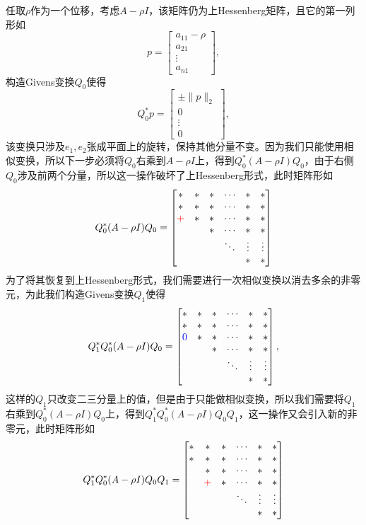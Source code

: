 \documentclass[a4paper,10pt]{ctexart}
\begin{document}
任取$ \rho $作为一个位移，考虑$ A-\rho I $，该矩阵仍为上Hessenberg矩阵，且它的第一列形如
\[
    p = \begin{bmatrix} 
        a_{11}-\rho \\ a_{21} \\ \vdots \\ a_{n1}
    \end{bmatrix},
\]
构造Givens变换$ Q_0 $使得
\[
    Q_0^* p = \begin{bmatrix} 
        \pm\| p \|_2 \\ 0 \\ \vdots \\ 0
    \end{bmatrix},
\]
该变换只涉及$ e_1,e_2 $张成平面上的旋转，保持其他分量不变。因为我们只能使用相似变换，所以下一步必须将$ Q_0 $右乘到$ A-\rho I $上，得到$ Q_0^*(A-\rho I)Q_0 $，由于右侧$ Q_0 $涉及前两个分量，所以这一操作破坏了上Hessenberg形式，此时矩阵形如
\[
    Q_0^*(A-\rho I)Q_0 = 
    \begin{bmatrix} 
        * & * & * & \cdots & * & * \\
        * & * & * & \cdots & * & * \\
        \textcolor{red}{+} & * & * & \cdots & * & * \\
          &   & * & \cdots & * & * \\
            &   &   & \ddots & \vdots & \vdots \\
            &   &   &        & * & *
    \end{bmatrix} 
\]
为了将其恢复到上Hessenberg形式，我们需要进行一次相似变换以消去多余的非零元，为此我们构造Givens变换$ Q_1 $使得
\[
    Q_1^*Q_0^*(A-\rho I)Q_0 = 
    \begin{bmatrix} 
        * & * & * & \cdots & * & * \\
        * & * & * & \cdots & * & * \\
        \textcolor{blue}{0} & * & * & \cdots & * & * \\
          &   & * & \cdots & * & * \\
            &   &   & \ddots & \vdots & \vdots \\
            &   &   &        & * & *
    \end{bmatrix},
\]
这样的$ Q_1 $只改变二三分量上的值，但是由于只能做相似变换，所以我们需要将$ Q_1 $右乘到$ Q_0^*(A-\rho I)Q_0 $上，得到$ Q_1^*Q_0^*(A-\rho I)Q_0Q_1 $，这一操作又会引入新的非零元，此时矩阵形如
\[
    Q_1^*Q_0^*(A-\rho I)Q_0Q_1 = 
    \begin{bmatrix} 
        * & * & * & \cdots & * & * \\
        * & * & * & \cdots & * & * \\
         & * & * & \cdots & * & * \\
          & \textcolor{red}{+}  & * & \cdots & * & * \\
            &   &   & \ddots & \vdots & \vdots \\
            &   &   &        & * & *
    \end{bmatrix}
\]
\end{document}
